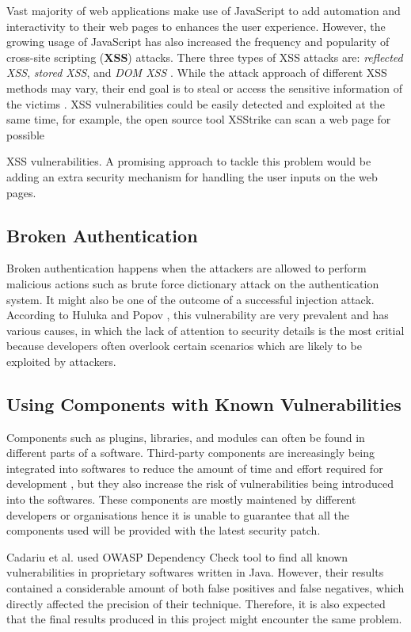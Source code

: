 \documentclass[12pt, a4paper]{report}
\begin{document}
Vast majority of web applications make use of JavaScript to add automation and interactivity to
their web pages to enhances the user experience. However, the growing usage of JavaScript has also
increased the frequency and popularity of cross-site scripting (\textbf{XSS}) attacks. There three
types of XSS attacks are: \textit{reflected XSS}, \textit{stored XSS}, and \textit{DOM XSS}
\cite{kieyzun_2009}. While the attack approach of different XSS methods may vary, their end goal is
to steal or access the sensitive information of the victims \cite{vogt_2007}. XSS vulnerabilities
could be easily detected and exploited at the same time, for example, the open source tool XSStrike
\cite{xsstrike} can scan a web page for possible {XSS vulnerabilities. A promising approach to
tackle this problem would be adding an extra security mechanism for handling the user inputs on the
web pages.

\subsection{Broken Authentication}
Broken authentication happens when the attackers are allowed to perform malicious actions such as
brute force dictionary attack on the authentication system. It might also be one of the outcome of a
successful injection attack. According to Huluka and Popov \cite{huluka_2012}, this vulnerability
are very prevalent and has various causes, in which the lack of attention to security details is the
most critial because developers often overlook certain scenarios which are likely to be exploited by
attackers.

\subsection{Using Components with Known Vulnerabilities}
Components such as plugins, libraries, and modules can often be found in different parts of a
software. Third-party components are increasingly being integrated into softwares to reduce the
amount of time and effort required for development \cite{balzarotti_2006}, but they also increase
the risk of vulnerabilities being introduced into the softwares. These components are mostly
maintened by different developers or organisations hence it is unable to guarantee that all the
components used will be provided with the latest security patch.

Cadariu et al. \cite{cadariu_2015} used OWASP Dependency Check tool \cite{owasp_dependency} to find
all known vulnerabilities in proprietary softwares written in Java. However, their results contained
a considerable amount of both false positives and false negatives, which directly affected the
precision of their technique. Therefore, it is also expected that the final results produced in this
project might encounter the same problem.

}
\end{document}
